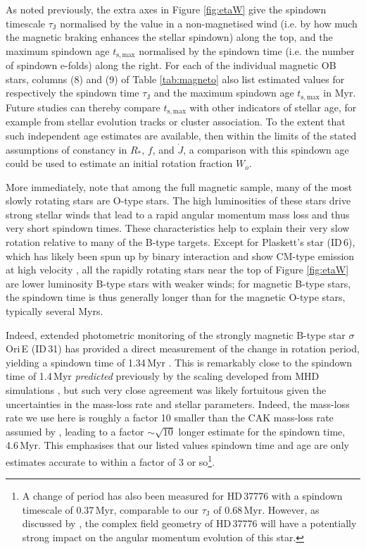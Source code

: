 \documentclass[useAMS,usenatbib]{mn2e}
\newcommand{\rs}{R_\ast}
\newcommand{\tauj}{\tau_\mathrm{J}}
\newcommand{\tsmax}{t_{\mathrm{s,max}}}
\begin{document}
As noted previously, the extra axes in Figure \ref{fig:etaW} give the spindown timescale $\tauj$ normalised by the value in a non-magnetised wind (i.e. by how much the magnetic braking enhances the stellar spindown) along the top, and the maximum spindown age $\tsmax$ normalised by the spindown time (i.e. the number of spindown e-folds) along the right.
For each of the individual magnetic OB stars, columns (8) and (9) of Table \ref{tab:magneto} also list estimated values  for respectively 
the spindown time $\tauj$ and the maximum spindown age $\tsmax$ in Myr.
Future studies can thereby compare $\tsmax$ with other indicators of stellar age, for example from stellar evolution tracks or cluster association. To the extent that such independent age estimates are available, then within the limits of the stated assumptions of constancy in $\rs$, $f$, and ${\dot J}$, a comparison with this spindown age could be used to estimate an initial rotation fraction $W_o$.

More immediately, note that among the full magnetic sample, many of the most slowly rotating stars are O-type stars.
The high luminosities of these stars drive strong stellar winds that lead to a rapid angular momentum mass loss and thus very short spindown times.
These characteristics help to explain their very slow rotation relative to many of the B-type targets. 
Except for Plaskett's star (ID\,6), which has likely been spun up by binary interaction and show CM-type emission at high velocity  \citep{Grunhut2012_plaskett}, all the rapidly rotating stars near the top of Figure \ref{fig:etaW} are lower luminosity B-type stars with weaker winds;  for magnetic B-type stars, the spindown time is thus generally longer than for the magnetic O-type stars, typically several Myrs.


Indeed,  extended photometric monitoring of the strongly magnetic B-type star $\sigma$\,Ori\,E (ID\,31) has provided a direct measurement of the change in rotation period, yielding  a spindown time of 1.34\,Myr \citep{2010ApJ...714L.318T,Townsend2012_MOST}. This is remarkably close to the spindown time of 1.4\,Myr   \textit{predicted} previously by the scaling developed from MHD simulations \citep{2009MNRAS.392.1022U}, but such very close agreement was likely fortuitous given the uncertainties in the mass-loss rate and stellar parameters. Indeed, the \citet{2000A&A...362..295V,2001A&A...369..574V} mass-loss rate we use here is roughly a factor 10 smaller than the CAK mass-loss rate assumed by \citet{2009MNRAS.392.1022U}, leading to a factor $\sim \sqrt{10}$ longer estimate for the spindown time, 4.6\,Myr. This emphasises that our listed values spindown time and age are only estimates accurate to within a factor of 3 or so\footnote{A change of period has also been measured for HD\,37776 \citep[ID\,34,][]{2011A&A...534L...5M} with a spindown timescale of 0.37\,Myr, comparable to our $\tauj$ of 0.68\,Myr. However, as discussed by \citet{2009MNRAS.392.1022U}, the complex field geometry of HD\,37776 \citep{2011ApJ...726...24K} will have a potentially strong impact on the angular momentum evolution of this star.}.
\end{document}
